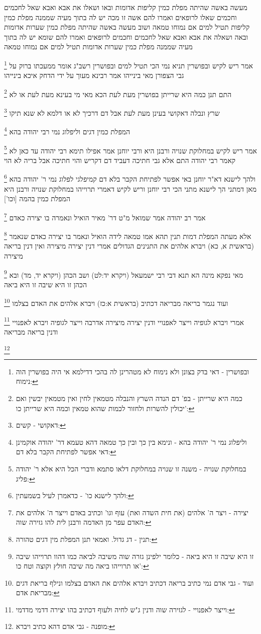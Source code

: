 \documentclass[12pt, openany]{book}
\newcommand{\footnotecomment}[1]{
	\renewcommand\thefootnote{}
	\footnote{#1}}
\newcommand{\commenta}[1]{\footnotecomment{#1}}
\begin{document}
{מעשה באשה שהיתה מפלת כמין קליפות אדומות ובאו ושאלו את אבא ואבא שאל לחכמים וחכמים שאלו לרופאים ואמרו להם אשה זו מכה יש לה בתוך מעיה שממנה מפלת כמין קליפות תטיל למים אם נמוחו טמאה 
ושוב מעשה באשה שהיתה מפלת כמין שערות אדומות ובאה ושאלה את אבא ואבא שאל לחכמים וחכמים לרופאים ואמרו להם שומא יש לה בתוך מעיה שממנה מפלת כמין שערות אדומות תטיל למים אם נמוחו טמאה 
\commenta{ובפושרין - דאי בדק בצונן ולא נימוח לא מטהרינן לה בהכי דדילמא אי היה בפושרין הוה נימוח:}
אמר ריש לקיש ובפושרין תניא נמי הכי תטיל למים ובפושרין רשב"ג אומר ממעכתו ברוק על גבי הצפורן מאי בינייהו אמר רבינא מעוך על ידי הדחק איכא בינייהו 
\commenta{כמה היא שרייתן - בפ' דם הנדה השרץ והנבלה מטמאין לחין ואין מטמאין יבשין ואם יכולין להשרות ולחזור לכמות שהוא טמאין וכמה היא שרייתן כו':}
התם תנן כמה היא שרייתן בפושרין מעת לעת הכא מאי מי בעינא מעת לעת או לא 
\commenta{דאקושי - קשים:}
שרץ ונבלה דאקושי בעינן מעת לעת אבל דם דרכיך לא או דלמא לא שנא תיקו
\commenta{וליפלוג נמי ר' יהודה בהא - ונימא בין כך ובין כך טמאה דהא טעמא דר' יהודה אוקמינן דאי אפשר לפתיחת הקבר בלא דם:}
המפלת כמין דגים וליפלוג נמי רבי יהודה בהא 
\commenta{במחלוקת שנויה - משנה זו שנויה במחלוקת דלאו סתמא ודברי הכל היא אלא ר' יהודה פליג:}
אמר ריש לקיש במחלוקת שנויה ורבנן היא ורבי יוחנן אמר אפילו תימא רבי יהודה עד כאן לא קאמר רבי יהודה התם אלא גבי חתיכה דעביד דם דקריש והוי חתיכה אבל בריה לא הוי 
\commenta{ולהך לישנא כו' - כדאמרן לעיל בשמעתין:}
ולהך לישנא דא"ר יוחנן באי אפשר לפתיחת הקבר בלא דם קמיפלגי לפלוג נמי ר' יהודה בהא 
מאן דמתני הך לישנא מתני הכי רבי יוחנן וריש לקיש דאמרי תרוייהו במחלוקת שנויה ורבנן היא
המפלת כמין בהמה [וכו']
\commenta{יצירה - ויצר ה' אלהים (את חית השדה ואת) עוף וגו' וכתיב באדם וייצר ה' אלהים את האדם עפר מן האדמה ורבנן לית להו גזירה שוה:}
אמר רב יהודה אמר שמואל מ"ט דר' מאיר הואיל ונאמרה בו יצירה כאדם 
\commenta{תנין - דג גדול. ואמאי תנן המפלת מין דגים טהורה:}
אלא מעתה המפלת דמות תנין תהא אמו טמאה לידה הואיל ונאמר בו יצירה כאדם שנאמר (בראשית א, כא) ויברא אלהים את התנינים הגדולים 
אמרי דנין יצירה מיצירה ואין דנין בריאה מיצירה 
\commenta{זו היא שיבה זו היא ביאה - כלומר ילפינן גזרה שוה משיבה לביאה כמו דהוו תרוייהו שיבה או תרוייהו ביאה מה שיבה חולץ וקוצה וטח כו':}
מאי נפקא מינה הא תנא דבי רבי ישמעאל (ויקרא יד:לט) ושב הכהן (ויקרא יד, מד) ובא הכהן זו היא שיבה זו היא ביאה 
\commenta{ועוד - גבי אדם נמי כתיב בריאה דכתיב ויברא אלהים את האדם בצלמו ונילף בריאת דגים מבריאת אדם:}
ועוד נגמר בריאה מבריאה דכתיב (בראשית א:כז) ויברא אלהים את האדם בצלמו 
\commenta{וייצר לאפנויי - לגזירה שוה ודנין ג"ש לחיה ולעוף דכתיב בהו יצירה דדמי מדדמי:}
אמרי ויברא לגופיה וייצר לאפנויי ודנין יצירה מיצירה 
אדרבה וייצר לגופיה ויברא לאפנויי ודנין בריאה מבריאה 
\commenta{מופנה - גבי אדם דהא כתיב ויברא:}
}
\end{document}
